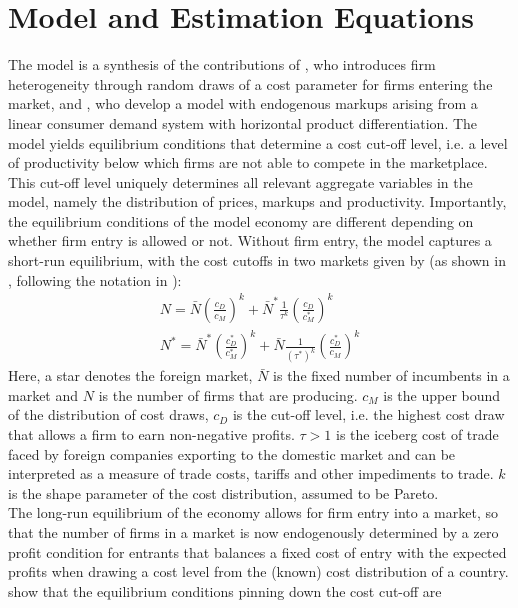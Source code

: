 
\section{Model and Estimation Equations}\label{sec:mo}

The \citet{MelitzOttaviano2008} model is a synthesis of the contributions of \citet{Melitz2003}, who introduces firm heterogeneity through random draws of a cost parameter for firms entering the market, and \citet{Ottaviano2002}, who develop a model with endogenous markups arising from a linear consumer demand system with horizontal product differentiation. The model yields equilibrium conditions that determine a cost cut-off level, i.e. a level of productivity below which firms are not able to compete in the marketplace. This cut-off level uniquely determines all relevant aggregate variables in the model, namely the distribution of prices, markups and productivity. Importantly, the equilibrium conditions of the model economy are different depending on whether firm entry is allowed or not. Without firm entry, the model captures a short-run equilibrium, with the cost cutoffs in two markets given by (as shown in \citet{MelitzOttaviano2008}, following the notation in \citet{Chen2009}):
\begin{align}
N = \bar{N} \left( \frac{c_D}{c_M} \right)^k + \bar{N}^* \frac{1}{\tau^k}\left( \frac{c_D}{c_M^*} \right)^k \label{eq:m-o-supply-n} \\
N^* = \bar{N}^* \left( \frac{c_D^*}{c_M^*} \right)^k + \bar{N} \frac{1}{\left( \tau^* \right)^k}\left( \frac{c_D^*}{c_M} \right)^k \label{eq:m-o-supply-n*}
\end{align}
Here, a star denotes the foreign market, $\bar{N}$ is the fixed number of incumbents in a market and $N$ is the number of firms that are producing. $c_M$ is the upper bound of the distribution of cost draws, $c_D$ is the cut-off level, i.e. the highest cost draw that allows a firm to earn non-negative profits. $\tau>1$ is the iceberg cost of trade faced by foreign companies exporting to the domestic market and can be interpreted as a measure of trade costs, tariffs and other impediments to trade. $k$ is the shape parameter of the cost distribution, assumed to be Pareto. \\
The long-run equilibrium of the economy allows for firm entry into a market, so that the number of firms in a market is now endogenously determined by a zero profit condition for entrants that balances a fixed cost of entry with the expected profits when drawing a cost level from the (known) cost distribution of a country. \citet{MelitzOttaviano2008} show that the equilibrium conditions pinning down the cost cut-off are
